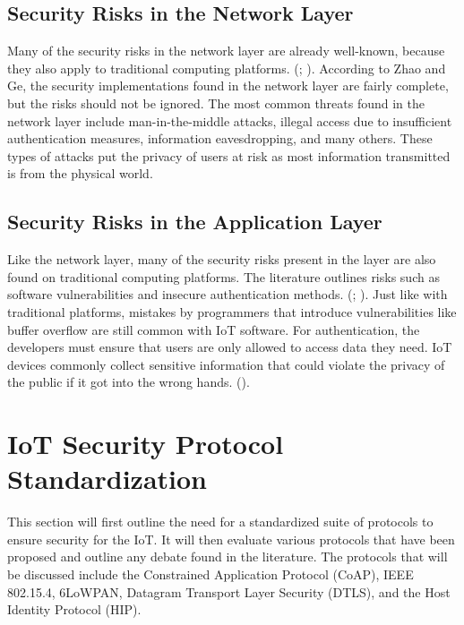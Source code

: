 \documentclass[letterpaper, 12pt]{article}
\begin{document}
\begin{flushleft}
\subsection*{Security Risks in the Network Layer}
Many of the security risks in the network layer are already well-known, because they also apply to traditional computing platforms. 
(\cite{Zhao6746513}; \cite{Xiaohui6643029}). According to Zhao and Ge, the security implementations found in the network layer are fairly complete, but
the risks should not be ignored. The most common threats found in the network layer include man-in-the-middle attacks, illegal access due to 
insufficient authentication measures, information eavesdropping, and many others. These types of attacks put the privacy of users at risk as most
information transmitted is from the physical world. 

\subsection*{Security Risks in the Application Layer}
Like the network layer, many of the security risks present in the layer are also found on traditional computing platforms. The literature outlines
risks such as software vulnerabilities and insecure authentication methods. (\cite{Zhao6746513}; \cite{Suo6188257}). Just like with traditional
platforms, mistakes by programmers that introduce vulnerabilities like buffer overflow are still common with IoT software. For authentication,
the developers must ensure that users are only allowed to access data they need. IoT devices commonly collect sensitive information that could
violate the privacy of the public if it got into the wrong hands. (\cite{Zhang:2015:EST:2714576.2737091}). 

\section*{IoT Security Protocol Standardization}

This section will first outline the need for a standardized suite of protocols to ensure security for the IoT. It will then evaluate various protocols
that have been proposed and outline any debate found in the literature. The protocols that will be discussed include the Constrained Application
Protocol (CoAP), IEEE 802.15.4, 6LoWPAN, Datagram Transport Layer Security (DTLS), and the Host Identity Protocol (HIP). 


\end{flushleft}
\end{document}
